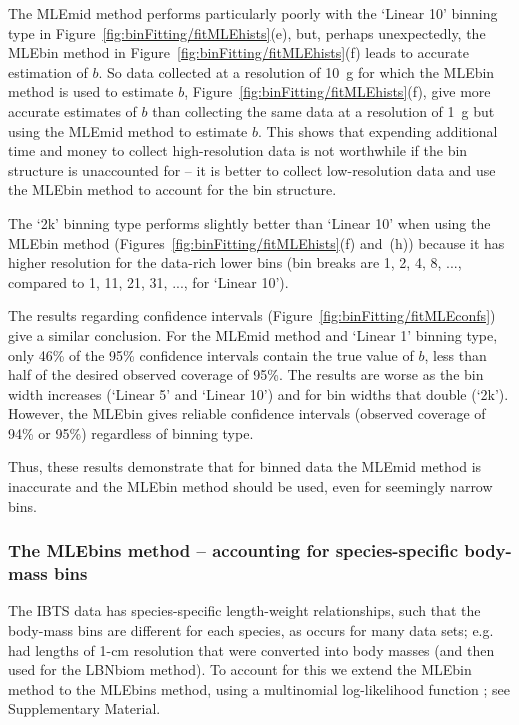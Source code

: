 \documentclass[12pt, letter]{article}
\newcommand{\fitMLEhists}{\ref{fig:binFitting/fitMLEhists}}
\newcommand{\fitMLEconfs}{\ref{fig:binFitting/fitMLEconfs}}
\begin{document}

The MLEmid method performs particularly poorly with the `Linear 10' binning type
in Figure~\fitMLEhists(e), but, perhaps unexpectedly, the MLEbin method in
Figure~\fitMLEhists(f) leads to accurate estimation of $b$. So data collected at
a resolution of 10~g for which the MLEbin method is used to estimate $b$,
Figure~\fitMLEhists(f), give more accurate estimates of $b$ than collecting the
same data at a resolution of 1~g but using the MLEmid method to estimate $b$.
This shows that expending additional time and money to collect
high-resolution data
is not
worthwhile if the bin structure is unaccounted for -- it is better to collect
low-resolution data and use the MLEbin method to account for the bin structure.

The `2k' binning type performs slightly better than `Linear 10' when using the
MLEbin method (Figures~\fitMLEhists(f) and~(h)) because it has higher resolution
for the data-rich lower bins (bin breaks are 1, 2, 4, 8, ..., compared to 1, 11,
21, 31, ..., for `Linear 10').

The results regarding confidence intervals (Figure~\fitMLEconfs) give a similar
conclusion. For the MLEmid method and `Linear 1' binning type, only 46\% of the
95\% confidence intervals contain the true value of $b$, less than half of the
desired observed coverage of 95\%. The results are worse as the bin width
increases (`Linear 5' and `Linear 10') and for bin widths that double
(`2k'). However, the MLEbin gives reliable confidence intervals (observed
coverage of 94\% or 95\%) regardless of binning type.

Thus, these results demonstrate that for binned data the MLEmid method is
inaccurate and the MLEbin method should be used, even for seemingly narrow bins.

\subsubsection{The MLEbins method  --  accounting for species-specific body-mass bins}

The IBTS data has species-specific length-weight
relationships, such that the
body-mass bins are different for each species, as occurs for many data sets;
e.g.~\citet{mnwb18} had lengths of 1-cm resolution that were
converted into body masses (and then used for the LBNbiom method).
To account for this we extend the MLEbin
method to the MLEbins method, using a multinomial
log-likelihood function \citep{lawl03}; see Supplementary Material.
\end{document}
